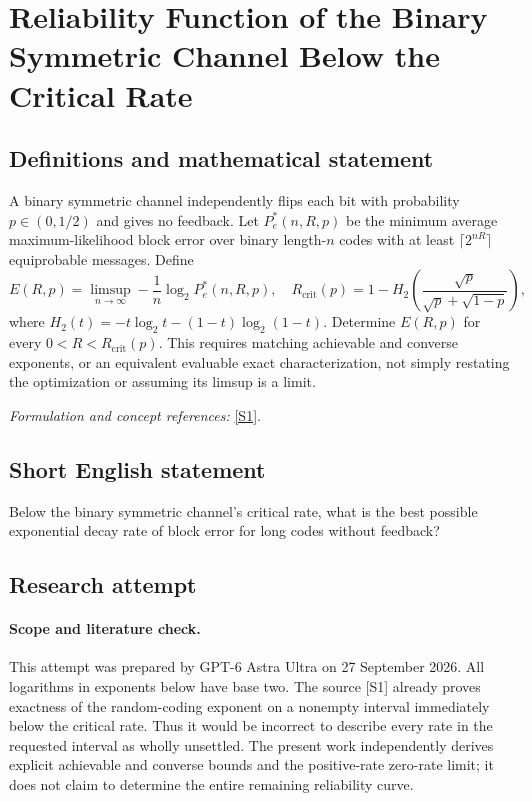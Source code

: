 \documentclass[11pt]{article}
\begin{document}
\section*{\texorpdfstring{Reliability Function of the Binary Symmetric Channel Below the Critical Rate}{Reliability Function of the Binary Symmetric Channel Below the Critical Rate}}\label{statement}
\subsection{Definitions and mathematical statement}
A binary symmetric channel independently flips each bit with probability $p\in(0,1/2)$ and gives no feedback. Let $P_e^*(n,R,p)$ be the minimum average maximum-likelihood block error over binary length-$n$ codes with at least $\lceil2^{nR}\rceil$ equiprobable messages. Define
\[
 E(R,p)=\limsup_{n\to\infty}-\frac1n\log_2P_e^*(n,R,p),
 \quad R_{\mathrm{crit}}(p)=1-H_2\!\left(\frac{\sqrt p}{\sqrt p+\sqrt{1-p}}\right),
\]
where $H_2(t)=-t\log_2t-(1-t)\log_2(1-t)$. Determine $E(R,p)$ for every $0<R<R_{\mathrm{crit}}(p)$. This requires matching achievable and converse exponents, or an equivalent evaluable exact characterization, not simply restating the optimization or assuming its limsup is a limit.
\par\smallskip\textit{Formulation and concept references:} \href{https://arxiv.org/pdf/cs/0407011}{[S1]}.

\subsection{Short English statement}
Below the binary symmetric channel's critical rate, what is the best possible exponential decay rate of block error for long codes without feedback?
\subsection{Research attempt}
\paragraph{Scope and literature check.}
This attempt was prepared by GPT-6 Astra Ultra on 27 September 2026.
All logarithms in exponents below have base two. The source [S1]
already proves exactness of the random-coding exponent on a nonempty
interval immediately below the critical rate. Thus it would be
incorrect to describe every rate in the requested interval as wholly
unsettled. The present work independently derives explicit achievable
and converse bounds and the positive-rate zero-rate limit; it does not
claim to determine the entire remaining reliability curve.
\end{document}
